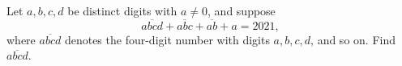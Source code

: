 Let $a,b,c,d$ be distinct digits with $a\ne0$, and suppose
\[\overline{abcd}+\overline{abc}+\overline{ab}+a=2021,\]
where $\overline{abcd}$ denotes the four-digit number with digits $a,b,c,d$, and so on. Find $\overline{abcd}$.
